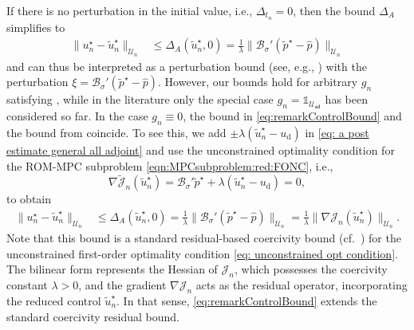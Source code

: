 \documentclass[reqno]{amsart}
\newcommand{\U}{{\mathscr U}}
\newcommand{\Uad}{\U_{\mathsf{ad}}}
\newcommand{\adState}{p}
\newcommand{\desired}[1]{#1_{\mathrm{d}}}
\newcommand{\inpVar}{u}
\newcommand{\inpVarDes}{\desired{u}}
\newcommand{\bOper}{\calB}
\newcommand{\initBound}{\initBoundn{n}}%
\newcommand{\initBoundn}[1]{\Delta_{t_{#1}}}
\newcommand{\optInpVar}[1]{\inpVar_{#1}^\star}
\newcommand{\optInpVarN}{\optInpVar{n}}
\newcommand{\switch}{\sigma}
\newcommand{\reduce}[1]{\tilde{#1}}
\newcommand{\BoundControlA}{\Delta_{A}}
\newcommand{\adStateRed}{\reduce{\adState}}
\newcommand{\Jhat}{\calJ}
\newcommand{\optAdStateRed}{\adStateRed^\star}
\newcommand{\optInpVarRed}[1]{\reduce{\inpVar}_{#1}^\star}
\newcommand{\optInpVarRedN}{\optInpVarRed{n}}
\newcommand{\intermediateAdStateA}{{\hat \adState}}
\newcommand{\calB}{\mathcal{B}}
\newcommand{\calJ}{\mathcal{J}}
\newcommand{\abbr}[1]{\textsf{#1}\xspace}
\newcommand{\ROM}{\abbr{ROM}}
\newcommand{\MPC}{\abbr{MPC}}
\begin{document}
\begin{remark}\label{rem:unconstrainedAPost}
    If there is no perturbation in the initial value, i.e., $\initBound=0$, then the bound $\BoundControlA$ simplifies to
        \begin{align}\label{eq:remarkControlBound}
             \|\optInpVarN-\optInpVarRedN\|_{\U_n} &\leq \BoundControlA(\optInpVarRedN, 0) = \tfrac{1}{\lambda}\|\bOper_{\switch}'(\optAdStateRed- \intermediateAdStateA)\|_{\U_n}
        \end{align}
        and can thus be interpreted as a perturbation bound (see, e.g., {\cite{DBLP:journals/coap/TroltzschV09}}) with the perturbation $\xi = \bOper_{\sigma}'(\optAdStateRed- \intermediateAdStateA)$. However, our bounds hold for arbitrary $g_n$ satisfying , while in the literature only the special case $g_n=\mathds{1}_{\Uad}$ has been considered so far. In the case $g_n\equiv 0$, the bound in \eqref{eq:remarkControlBound} and the bound from {\cite{DBLP:journals/coap/TroltzschV09}} coincide. To see this, we add $\pm \lambda (\optInpVarRedN-\inpVarDes)$ in \eqref{eq: a post estimate general all adjoint} and use the unconstrained optimality condition for the \ROM-\MPC subproblem \eqref{eqn:MPCsubproblem:red:FONC}, i.e.,
        \[\nabla \reduce{\Jhat}_n(\optInpVarRedN) = \bOper_{\switch}'\optAdStateRed + \lambda (\optInpVarRedN-\inpVarDes)=0,\]
        to obtain
         \begin{align}
             \|\optInpVarN-\optInpVarRedN\|_{\U_n} &\leq \BoundControlA(\optInpVarRedN,0)=\tfrac{1}{\lambda}\|\bOper_{\switch}'(\optAdStateRed- \intermediateAdStateA)\|_{\U_n}
             = \tfrac{1}{\lambda}\|\nabla \Jhat_n (\optInpVarRedN)\|_{\U_n}\nonumber.
        \end{align}
         Note that this bound is a standard residual-based coercivity bound (cf.~{\cite{patera2007reduced}}) for the unconstrained first-order optimality condition \eqref{eq: unconstrained opt condition}. The bilinear form represents the Hessian of ${\Jhat}_n$, which possesses the coercivity constant $\lambda>0$, and the gradient $\nabla {\Jhat}_n$ acts as the residual operator, incorporating the reduced control $\optInpVarRedN$. In that sense, \eqref{eq:remarkControlBound} extends the standard coercivity residual bound.
\end{remark}
%
\end{document}

